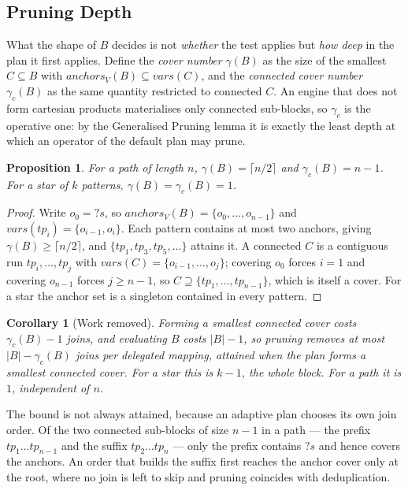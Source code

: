\documentclass{article}
\newtheorem{proposition}{Proposition}
\newtheorem{corollary}{Corollary}
\begin{document}
\subsection*{Pruning Depth}

What the shape of $B$ decides is not \emph{whether} the test applies but \emph{how deep}
in the plan it first applies. Define the \emph{cover number} $\gamma(B)$ as the size of
the smallest $C \subseteq B$ with $\mathit{anchors}_V(B) \subseteq \mathit{vars}(C)$, and
the \emph{connected cover number} $\gamma_c(B)$ as the same quantity restricted to
connected $C$. An engine that does not form cartesian products materialises only
connected sub-blocks, so $\gamma_c$ is the operative one: by the Generalised Pruning
lemma it is exactly the least depth at which an operator of the default plan may prune.

\begin{proposition}
For a path of length $n$, $\gamma(B) = \lceil n/2 \rceil$ and $\gamma_c(B) = n - 1$. For
a star of $k$ patterns, $\gamma(B) = \gamma_c(B) = 1$.
\end{proposition}

\begin{proof}
Write $o_0 = {?s}$, so $\mathit{anchors}_V(B) = \{o_0, \dots, o_{n-1}\}$ and
$\mathit{vars}(tp_i) = \{o_{i-1}, o_i\}$. Each pattern contains at most two anchors,
giving $\gamma(B) \geq \lceil n/2 \rceil$, and $\{tp_1, tp_3, tp_5, \dots\}$ attains it.
A connected $C$ is a contiguous run $tp_i, \dots, tp_j$ with $\mathit{vars}(C) =
\{o_{i-1}, \dots, o_j\}$; covering $o_0$ forces $i = 1$ and covering $o_{n-1}$ forces
$j \geq n-1$, so $C \supseteq \{tp_1, \dots, tp_{n-1}\}$, which is itself a cover. For a
star the anchor set is a singleton contained in every pattern.
\end{proof}

\begin{corollary}[Work removed]
\label{cor:work}
Forming a smallest connected cover costs $\gamma_c(B) - 1$ joins, and evaluating $B$
costs $|B| - 1$, so pruning removes at most $|B| - \gamma_c(B)$ joins per delegated
mapping, attained when the plan forms a smallest connected cover. For a star this is
$k - 1$, the whole block. For a path it is $1$, independent of $n$.
\end{corollary}

The bound is not always attained, because an adaptive plan chooses its own join order. Of
the two connected sub-blocks of size $n-1$ in a path --- the prefix $tp_1 \dots tp_{n-1}$
and the suffix $tp_2 \dots tp_n$ --- only the prefix contains $?s$ and hence covers the
anchors. An order that builds the suffix first reaches the anchor cover only at the root,
where no join is left to skip and pruning coincides with deduplication.
\end{document}
